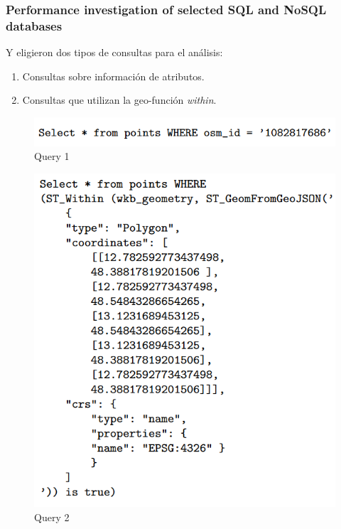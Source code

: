\begin{frame}
    \frametitle{Performance investigation of selected SQL and NoSQL databases}
    
    \begin{minipage}{0.55\textwidth}

        Y eligieron dos tipos de consultas para el análisis:

        \begin{enumerate}
            \item Consultas sobre información de atributos.
    
            \item Consultas que utilizan la geo-función \textit{within}.
        \end{enumerate}
        
        \begin{figure}
            \centering
            \includegraphics[width=\textwidth]{images/geo_q1.png}
            \caption{Query 1}
        \end{figure}
    \end{minipage}\hfill
    \begin{minipage}{0.43\textwidth}
        \begin{figure}
            \centering
            \includegraphics[width=\textwidth]{images/geo_q2.png}
            \caption{Query 2}
        \end{figure}
    \end{minipage}
    
\end{frame}

